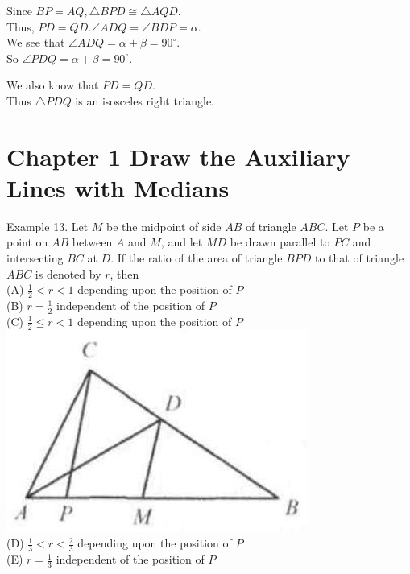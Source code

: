 \documentclass[10pt]{article}
\begin{document}
Since \(B P=A Q, \triangle B P D \cong \triangle A Q D\).\\
Thus, \(P D=Q D . \angle A D Q=\angle B D P=\alpha\).\\
We see that \(\angle A D Q=\alpha+\beta=90^{\circ}\).\\
So \(\angle P D Q=\alpha+\beta=90^{\circ}\).

We also know that \(P D=Q D\).\\
Thus \(\triangle P D Q\) is an isosceles right triangle.

\section*{Chapter 1 Draw the Auxiliary Lines with Medians}
Example 13. Let \(M\) be the midpoint of side \(A B\) of triangle \(A B C\). Let \(P\) be a point on \(A B\) between \(A\) and \(M\), and let \(M D\) be drawn parallel to \(P C\) and intersecting \(B C\) at \(D\). If the ratio of the area of triangle \(B P D\) to that of triangle \(A B C\) is denoted by \(r\), then\\
(A) \(\frac{1}{2}<r<1\) depending upon the position of \(P\)\\
(B) \(r=\frac{1}{2}\) independent of the position of \(P\)\\
(C) \(\frac{1}{2} \leq r<1\) depending upon the position of \(P\)\\
\includegraphics[max width=\textwidth, center]{2025_04_17_97bc1f7e44d93c271a88g-014(1)}\\
(D) \(\frac{1}{3}<r<\frac{2}{3}\) depending upon the position of \(P\)\\
(E) \(r=\frac{1}{3}\) independent of the position of \(P\)
\end{document}
